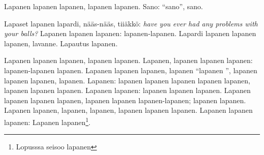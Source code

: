 \documentclass[a4paper]{article}
\begin{document}
\begin{multicols}{2}
Lapanen lapanen lapanen, lapanen lapanen. Sano: ``sano'', sano.

Lapaset lapanen lapardi, nääs-nääs, tiiäkkö: \textit{have you ever had any problems with your balls?} Lapanen lapanen
lapanen: lapanen-lapanen. Lapardi lapanen lapanen lapanen, lavanne. Lapautus lapanen.

Lapanen lapanen lapanen, lapanen lapanen. Lapanen, lapanen lapanen lapanen: lapanen-lapanen lapanen. Lapanen lapanen
lapanen, lapanen ``lapanen '', lapanen lapanen lapanen, lapanen. Lapanen: lapanen lapanen lapanen lapanen lapanen,
lapanen lapanen lapanen. Lapanen lapanen: lapanen lapanen lapanen. Lapanen lapanen lapanen lapanen, lapanen lapanen
lapanen-lapanen; lapanen lapanen. Lapanen lapanen, lapanen, lapanen, lapanen lapanen lapanen.
Lapanen lapanen lapanen: Lapanen lapanen\footnote{Lopusssa seisoo lapanen}.


\printbibliography[title={Lapautteet}]

\end{multicols}
\end{document}
